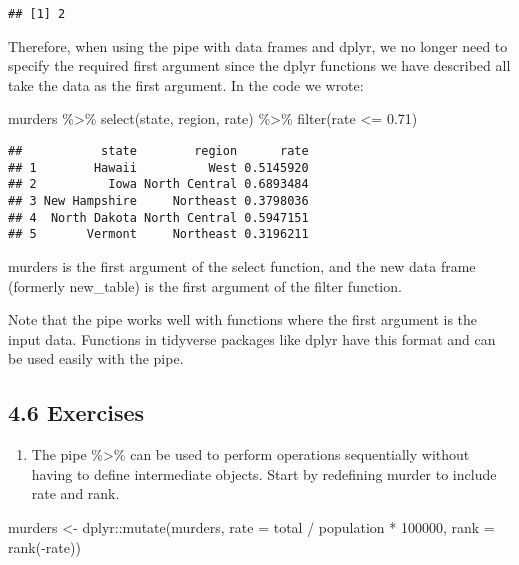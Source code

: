 \documentclass[
]{article}
\newenvironment{Shaded}{\begin{snugshade}}{\end{snugshade}}
\newcommand{\AttributeTok}[1]{\textcolor[rgb]{0.77,0.63,0.00}{#1}}
\newcommand{\DecValTok}[1]{\textcolor[rgb]{0.00,0.00,0.81}{#1}}
\newcommand{\FloatTok}[1]{\textcolor[rgb]{0.00,0.00,0.81}{#1}}
\newcommand{\FunctionTok}[1]{\textcolor[rgb]{0.00,0.00,0.00}{#1}}
\newcommand{\NormalTok}[1]{#1}
\newcommand{\OtherTok}[1]{\textcolor[rgb]{0.56,0.35,0.01}{#1}}
\newcommand{\SpecialCharTok}[1]{\textcolor[rgb]{0.00,0.00,0.00}{#1}}
\providecommand{\tightlist}{%
  \setlength{\itemsep}{0pt}\setlength{\parskip}{0pt}}
\begin{document}
\begin{verbatim}
## [1] 2
\end{verbatim}

Therefore, when using the pipe with data frames and dplyr, we no longer
need to specify the required first argument since the dplyr functions we
have described all take the data as the first argument. In the code we
wrote:

\begin{Shaded}
\begin{Highlighting}[]
\NormalTok{murders }\SpecialCharTok{\%\textgreater{}\%} \FunctionTok{select}\NormalTok{(state, region, rate) }\SpecialCharTok{\%\textgreater{}\%} \FunctionTok{filter}\NormalTok{(rate }\SpecialCharTok{\textless{}=} \FloatTok{0.71}\NormalTok{)}
\end{Highlighting}
\end{Shaded}

\begin{verbatim}
##           state        region      rate
## 1        Hawaii          West 0.5145920
## 2          Iowa North Central 0.6893484
## 3 New Hampshire     Northeast 0.3798036
## 4  North Dakota North Central 0.5947151
## 5       Vermont     Northeast 0.3196211
\end{verbatim}

murders is the first argument of the select function, and the new data
frame (formerly new\_table) is the first argument of the filter
function.

Note that the pipe works well with functions where the first argument is
the input data. Functions in tidyverse packages like dplyr have this
format and can be used easily with the pipe.

\hypertarget{exercises-1}{%
\subsection{4.6 Exercises}\label{exercises-1}}

\begin{enumerate}
\def\labelenumi{\arabic{enumi}.}
\tightlist
\item
  The pipe \%\textgreater\% can be used to perform operations
  sequentially without having to define intermediate objects. Start by
  redefining murder to include rate and rank.
\end{enumerate}

\begin{Shaded}
\begin{Highlighting}[]
\NormalTok{murders }\OtherTok{\textless{}{-}}\NormalTok{ dplyr}\SpecialCharTok{::}\FunctionTok{mutate}\NormalTok{(murders, }\AttributeTok{rate =}\NormalTok{  total }\SpecialCharTok{/}\NormalTok{ population }\SpecialCharTok{*} \DecValTok{100000}\NormalTok{, }
                  \AttributeTok{rank =} \FunctionTok{rank}\NormalTok{(}\SpecialCharTok{{-}}\NormalTok{rate))}
\end{Highlighting}
\end{Shaded}
\end{document}
